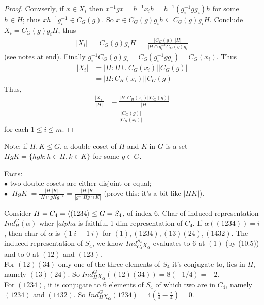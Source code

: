 \documentclass[a4paper]{article}
\begin{document}
\begin{lemma}
\begin{proof}
Convserly, if $x\in X_i$ then $x^{-1} gx = h^{-1} x_i h = h^{-1} (g_i^{-1} gg_i)h$ for some $h \in H$; thus $xh^{-1} g_i^{-1} \in C_G(g)$. So $x \in C_G(g) g_i h \subseteq C_G(g) g_i H$. Conclude $X_i = C_G (g) g_i H$, thus 
\begin{equation*}
\begin{aligned}
|X_i| = |C_G(g) g_i H| = \frac{|C_G(g)||H|}{|H \cap g_i^{-1} C_G (g) g_i}
\end{aligned}
\end{equation*}
(see notes at end). Finally $g_i^{-1} C_G(g) g_i = C_G(g_i^{-1} gg_i) = C_G(x_i)$. Thus
\begin{equation*}
\begin{aligned}
|X_i| &= |H:H \cup C_G(x_i)||C_G(g)|\\
&=|H:C_H(x_i)||C_G(g)|
\end{aligned}
\end{equation*}
Thus, 
\begin{equation*}
\begin{aligned}
\frac{|X_i|}{|H|} &= \frac{|H:C_H(x_i)||C_G(g)|}{|H|}\\
&= \frac{|C_G(g)|}{|C_H(x_i)|}
\end{aligned}
\end{equation*}
for each $1 \leq i \leq m$.
\end{proof}
\end{lemma}

Note: if $H,K \leq G$, a double coset of $H$ and $K$ in $G$ is a set $HgK = \{hgk:h \in H,k \in K\}$ for some $g \in G$.

Facts:\\
$\bullet$ two double cosets are either disjoint or equal;\\
$\bullet$ $|HgK| = \frac{|H||K|}{|H \cap gKg^{-1}} = \frac{|H||K|}{|g^{-1} Hg\cap K|}$ (prove this: it's a bit like $|HK|$).

\begin{eg}
Consider $H = C_4 = \langle (1234 \rangle \leq G = S_4$, of index 6. Char of induced representation $Ind_H^G(\alpha)$ wher $|alpha$ is faithful 1-dim representation of $C_4$. If $\alpha((1234)) = i$, then char of $\alpha$ is $(1\ i\ -1\ i)$ for $(1),(1234),(13)(24),(1432)$. The induced representation of $S_4$, we know $Ind_{C_4}^{S_4} \chi_\alpha$ evaluates to 6 at $(1)$ (by (10.5)) and to $0$ at $(12)$ and $(123)$.\\
For $(12)(34)$ only one of the three elements of $S_4$ it's conjugate to, lies in $H$, namely $(13)(24)$. So $Ind_H^G \chi_\alpha((12)(34)) = 8(-1/4) = -2$.\\
For $(1234)$, it is conjugate to $6$ elements of $S_4$ of which two are in $C_4$, namely $(1234)$ and $(1432)$. So $Ind_H^G \chi_\alpha (1234) = 4(\frac{i}{4} - \frac{i}{4}) = 0$.
\end{eg}
\end{document}
